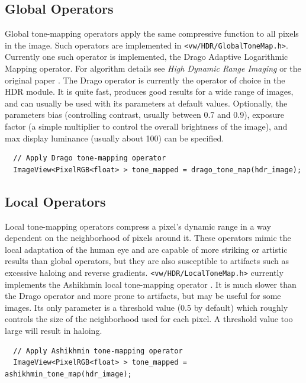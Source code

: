 \subsection{Global Operators}
Global tone-mapping operators apply the same compressive function to
all pixels in the image. Such operators are implemented in
\verb#<vw/HDR/GlobalToneMap.h>#. Currently one such operator is implemented, the
Drago Adaptive Logarithmic Mapping operator.  For algorithm details
see \emph{High Dynamic Range Imaging} \cite{hdrbook} or the original
paper \cite{drago}.  The Drago operator is currently the operator of
choice in the HDR module. It is quite fast, produces good results for
a wide range of images, and can usually be used with its parameters at
default values. Optionally, the parameters bias (controlling contrast,
usually between 0.7 and 0.9), exposure factor (a simple multiplier to
control the overall brightness of the image), and max display
luminance (usually about 100) can be specified.

\begin{verbatim}
  // Apply Drago tone-mapping operator 
  ImageView<PixelRGB<float> > tone_mapped = drago_tone_map(hdr_image);
\end{verbatim}

\subsection{Local Operators}
Local tone-mapping operators compress a pixel's dynamic range in a way
dependent on the neighborhood of pixels around it. These operators
mimic the local adaptation of the human eye and are capable of more
striking or artistic results than global operators, but they are also
susceptible to artifacts such as excessive haloing and reverse
gradients. \verb#<vw/HDR/LocalToneMap.h># currently implements the Ashikhmin local
tone-mapping operator \cite{ashikhmin}.  It is much slower than the
Drago operator and more prone to artifacts, but may be useful for some
images. Its only parameter is a threshold value (0.5 by default) which
roughly controls the size of the neighborhood used for each pixel. A
threshold value too large will result in haloing.

\begin{verbatim}
  // Apply Ashikhmin tone-mapping operator 
  ImageView<PixelRGB<float> > tone_mapped = ashikhmin_tone_map(hdr_image);
\end{verbatim}



